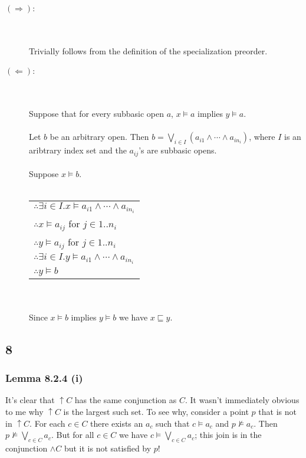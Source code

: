 \documentclass{article}
\begin{document}
\begin{description}

\item[$(\Rightarrow)$:]~\\~\\
Trivially follows from the definition of the specialization preorder.

\item[$(\Leftarrow)$:]~\\~\\
Suppose that for every subbasic open $a$, $x \vDash a$ implies $y \vDash a$.\\~\\
Let $b$ be an arbitrary open. Then $b = \bigvee_{i \in I} (a_{i1} \wedge \cdots \wedge a_{i n_i})$, where
$I$ is an aribtrary index set and the $a_{ij}$'s are subbasic opens.\\~\\
Suppose $x \vDash b$.\\~\\
\begin{tabular}{l}
$\therefore \exists i \in I. x \vDash a_{i1} \wedge \cdots \wedge a_{i n_i}$ \\
$\therefore x \vDash a_{i j}$ for $j \in 1..n_i$ \\
$\therefore y \vDash a_{i j}$ for $j \in 1..n_i$ \\
$\therefore \exists i \in I. y \vDash a_{i1} \wedge \cdots \wedge a_{i n_i}$ \\
$\therefore y \vDash b$ \\
\end{tabular}~\\~\\
Since $x \vDash b$ implies $y \vDash b$ we have $x \sqsubseteq y$.
\end{description}

\subsection*{8}

\subsubsection*{Lemma 8.2.4 (i)}

It's clear that $\uparrow C$ has the same conjunction as $C$. It wasn't immediately obvious to me
why $\uparrow C$ is the largest such set. To see why, consider a point $p$ that is not in 
$\uparrow C$. For each $c \in C$ there exists an $a_c$ such that $c \vDash a_c$ and $p \not \vDash a_c$.
Then $p \not \vDash \bigvee_{c \in C} a_c$. But for all $c \in C$ we have $c \vDash \bigvee_{c \in C} a_c$;
this join is in the conjunction $\wedge C$ but it is not satisfied by $p$!
\end{document}
